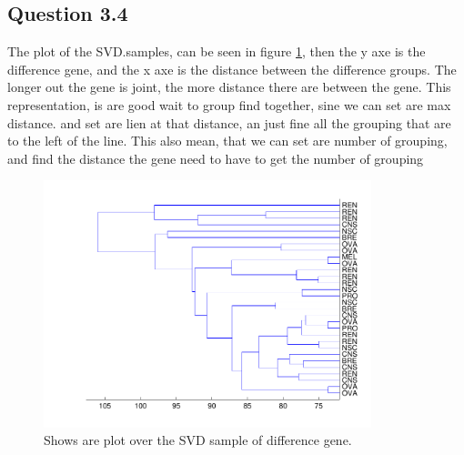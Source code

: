 \subsection*{Question 3.4}
The plot of the SVD.samples, can be seen in figure \ref{fig:q34}, then the y axe is the difference gene, and the x axe is the distance between the difference groups. The longer out the gene is joint, the more distance there are between the gene. This representation, is are good wait to group find together, sine we can set are max distance. and set are lien at that distance, an just fine all the grouping that are to the left of the line. This also mean, that we can set are number of grouping, and find the distance the gene need to have to get the number of grouping
\begin{figure}[!htbp]
  \centering
  \includegraphics[width=0.85\textwidth]{./images/q34}
  \caption{Shows are plot over the SVD sample of difference gene.}
  \label{fig:q34}
\end{figure}

